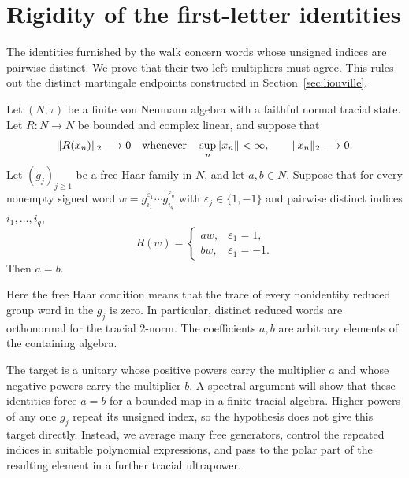 \section{Rigidity of the first-letter identities}\label{sec:rigidity}

The identities furnished by the walk concern words whose unsigned indices
are pairwise distinct.  We prove that their two left multipliers must
agree.  This rules out the distinct martingale endpoints constructed
in Section~\ref{sec:liouville}.

\begin{theorem}\label{thm:rigidity}
Let $(N,\tau)$ be a finite von Neumann algebra with a faithful normal
tracial state.  Let $R:N\to N$ be bounded and complex linear, and suppose
that
\begin{equation}\label{eq:rigidity-continuity}
 \lVert R(x_n)\rVert_2\longrightarrow0
 \quad\text{whenever}\quad
 \sup_n\lVert x_n\rVert<\infty,
 \qquad \lVert x_n\rVert_2\longrightarrow0.
\end{equation}
Let $(g_j)_{j\geq1}$ be a free Haar family in $N$, and let $a,b\in N$.
Suppose that for every nonempty signed word
$w=g_{i_1}^{\varepsilon_1}\cdots g_{i_q}^{\varepsilon_q}$ with
$\varepsilon_j\in\{1,-1\}$ and pairwise distinct indices $i_1,\ldots,i_q$,
\begin{equation}\label{eq:rigidity-first-letter}
 R(w)=
 \begin{cases}
 aw,&\varepsilon_1=1,\\
 bw,&\varepsilon_1=-1.
 \end{cases}
\end{equation}
Then $a=b$.
\end{theorem}

Here the free Haar condition means that the trace of every nonidentity
reduced group word in the $g_j$ is zero.  In particular, distinct reduced
words are orthonormal for the tracial $2$-norm.  The coefficients $a,b$
are arbitrary elements of the containing algebra.

The target is a unitary whose positive powers carry the multiplier $a$
and whose negative powers carry the multiplier $b$.  A spectral argument
will show that these identities force $a=b$ for a bounded map in a finite
tracial algebra.  Higher powers of any one $g_j$ repeat its unsigned index, so
the hypothesis does not give this target directly.  Instead, we average
many free generators, control the repeated indices in suitable polynomial
expressions, and pass to the polar part of the resulting element in a
further tracial ultrapower.

